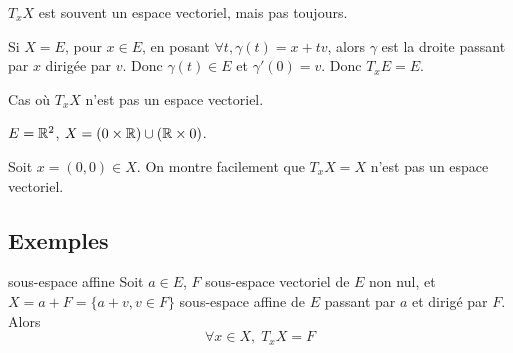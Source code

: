 \begin{remarque}
    $T_xX$ est souvent un espace vectoriel, mais pas toujours.
\end{remarque}

\begin{exemple}
    Si $X = E$, pour $x \in E$, en posant $\forall t, \gamma(t) = x + tv$, alors 
    $\gamma$ est la droite passant par $x$ dirigée par $v$. Donc
    $\gamma(t) \in E$ et $\gamma'(0) = v$. Donc $T_xE = E$.
\end{exemple}

\begin{exemple}
    Cas où $T_xX$ n'est pas un espace vectoriel.

    $E = \mathbb{R}^2$, $X = (0 \times \mathbb{R}) \cup (\mathbb{R} \times 0)$.

    Soit $x = (0, 0) \in X$. On montre facilement que $T_xX = X$ n'est 
    pas un espace vectoriel.
\end{exemple}

\subsection{Exemples}

\begin{proposition}{sous-espace affine}{}
    Soit $a \in E$, $F$ sous-espace vectoriel de $E$ non nul, et 
    $X = a + F = \{a + v, v \in F\}$ sous-espace affine de $E$ passant par $a$ 
    et dirigé par $F$.
    Alors $$\forall x \in X, \; T_xX = F$$
\end{proposition}


